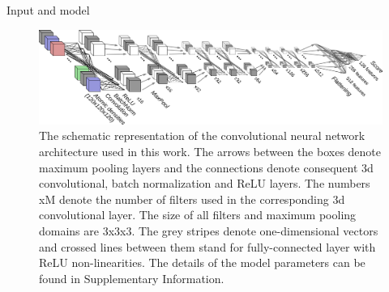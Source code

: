 \documentclass[final, unknownkeysallowed]{beamer}
\begin{document}
\begin{frame}{}
\begin{textblock}{39.0}
\begin{block}{Input and model}
\begin{figure}[H]
    \centering
    \includegraphics[width=\linewidth]{../draft/Fig/ConvnetDiagramV1.png}
    \caption{The schematic representation of the convolutional neural network architecture used in this work. 
    The arrows between the boxes denote maximum pooling layers and the connections denote 
    consequent 3d convolutional, batch normalization and ReLU layers. The numbers xM denote the number of filters 
    used in the corresponding 3d convolutional layer. The size of all filters and 
    maximum pooling domains are 3x3x3. The grey stripes denote one-dimensional vectors and crossed lines between them 
    stand for fully-connected layer with ReLU non-linearities. The details of the model parameters can be found in 
    Supplementary Information.}
    \label{Fig:CNNModel}
\end{figure}

\end{block}


\end{textblock}
\end{frame}
\end{document}
